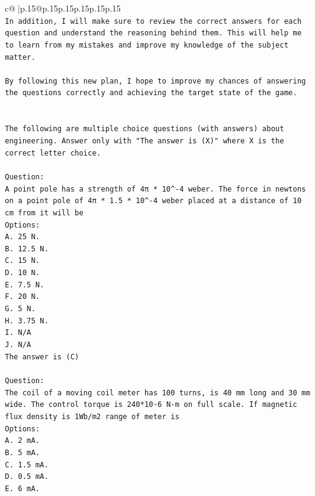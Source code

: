 \documentclass{article}
\begin{document}
{\begin{supertabular}{c@{$\;$}|p{.15\linewidth}@{}p{.15\linewidth}p{.15\linewidth}p{.15\linewidth}p{.15\linewidth}p{.15\linewidth}}
{{{\\ 
\texttt{In addition, I will make sure to review the correct answers for each question and understand the reasoning behind them. This will help me to learn from my mistakes and improve my knowledge of the subject matter.} \\
\\ 
\texttt{By following this new plan, I hope to improve my chances of answering the questions correctly and achieving the target state of the game.} \\
\\ 
\\ 
\texttt{The following are multiple choice questions (with answers) about engineering. Answer only with "The answer is (X)" where X is the correct letter choice.} \\
\\ 
\texttt{Question:} \\
\texttt{A point pole has a strength of 4π * 10\^{}{-}4 weber. The force in newtons on a point pole of 4π * 1.5 * 10\^{}{-}4 weber placed at a distance of 10 cm from it will be} \\
\texttt{Options:} \\
\texttt{A. 25 N.} \\
\texttt{B. 12.5 N.} \\
\texttt{C. 15 N.} \\
\texttt{D. 10 N.} \\
\texttt{E. 7.5 N.} \\
\texttt{F. 20 N.} \\
\texttt{G. 5 N.} \\
\texttt{H. 3.75 N.} \\
\texttt{I. N/A} \\
\texttt{J. N/A} \\
\texttt{The answer is (C)} \\
\\ 
\texttt{Question:} \\
\texttt{The coil of a moving coil meter has 100 turns, is 40 mm long and 30 mm wide. The control torque is 240*10{-}6 N{-}m on full scale. If magnetic flux density is 1Wb/m2 range of meter is} \\
\texttt{Options:} \\
\texttt{A. 2 mA.} \\
\texttt{B. 5 mA.} \\
\texttt{C. 1.5 mA.} \\
\texttt{D. 0.5 mA.} \\
\texttt{E. 6 mA.} \\
}}}
\end{supertabular}}
\end{document}
